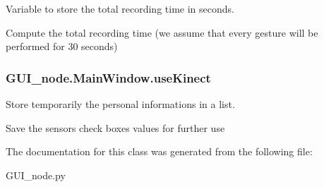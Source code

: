 Variable to store the total recording time in seconds. 

Compute the total recording time (we assume that every gesture will be performed for 30 seconds) 
\subsubsection[{\texorpdfstring{use\+Kinect}{useKinect}}]{\setlength{\rightskip}{0pt plus 5cm}G\+U\+I\+\_\+node.\+Main\+Window.\+use\+Kinect}\hypertarget{classGUI__node_1_1MainWindow_a502815d4d7eab08224b9fe98c31483aa}{}\label{classGUI__node_1_1MainWindow_a502815d4d7eab08224b9fe98c31483aa}


Store temporarily the personal informations in a list. 

Save the sensors check boxes values for further use 

The documentation for this class was generated from the following file\+:\begin{DoxyCompactItemize}
\item 
G\+U\+I\+\_\+node.\+py\end{DoxyCompactItemize}
